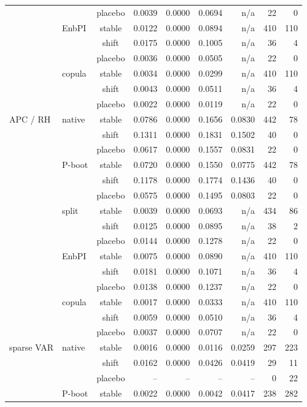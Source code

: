 {\begin{longtable}{@{}llcrrrrrr@{}}
 &  & placebo & 0.0039 & 0.0000 & 0.0694 & n/a & 22 & 0 \\
 & EnbPI & stable & 0.0122 & 0.0000 & 0.0894 & n/a & 410 & 110 \\
 &  & shift & 0.0175 & 0.0000 & 0.1005 & n/a & 36 & 4 \\
 &  & placebo & 0.0036 & 0.0000 & 0.0505 & n/a & 22 & 0 \\
 & copula & stable & 0.0034 & 0.0000 & 0.0299 & n/a & 410 & 110 \\
 &  & shift & 0.0043 & 0.0000 & 0.0511 & n/a & 36 & 4 \\
 &  & placebo & 0.0022 & 0.0000 & 0.0119 & n/a & 22 & 0 \\
\addlinespace[2pt]
APC / RH & native & stable & 0.0786 & 0.0000 & 0.1656 & 0.0830 & 442 & 78 \\
 &  & shift & 0.1311 & 0.0000 & 0.1831 & 0.1502 & 40 & 0 \\
 &  & placebo & 0.0617 & 0.0000 & 0.1557 & 0.0831 & 22 & 0 \\
 & P-boot & stable & 0.0720 & 0.0000 & 0.1550 & 0.0775 & 442 & 78 \\
 &  & shift & 0.1178 & 0.0000 & 0.1774 & 0.1436 & 40 & 0 \\
 &  & placebo & 0.0575 & 0.0000 & 0.1495 & 0.0803 & 22 & 0 \\
 & split & stable & 0.0039 & 0.0000 & 0.0693 & n/a & 434 & 86 \\
 &  & shift & 0.0125 & 0.0000 & 0.0895 & n/a & 38 & 2 \\
 &  & placebo & 0.0144 & 0.0000 & 0.1278 & n/a & 22 & 0 \\
 & EnbPI & stable & 0.0075 & 0.0000 & 0.0890 & n/a & 410 & 110 \\
 &  & shift & 0.0181 & 0.0000 & 0.1071 & n/a & 36 & 4 \\
 &  & placebo & 0.0138 & 0.0000 & 0.1237 & n/a & 22 & 0 \\
 & copula & stable & 0.0017 & 0.0000 & 0.0333 & n/a & 410 & 110 \\
 &  & shift & 0.0059 & 0.0000 & 0.0510 & n/a & 36 & 4 \\
 &  & placebo & 0.0037 & 0.0000 & 0.0707 & n/a & 22 & 0 \\
\addlinespace[2pt]
sparse VAR & native & stable & 0.0016 & 0.0000 & 0.0116 & 0.0259 & 297 & 223 \\
 &  & shift & 0.0162 & 0.0000 & 0.0426 & 0.0419 & 29 & 11 \\
 &  & placebo & -- & -- & -- & -- & 0 & 22 \\
 & P-boot & stable & 0.0022 & 0.0000 & 0.0042 & 0.0417 & 238 & 282 \\

\end{longtable}}
